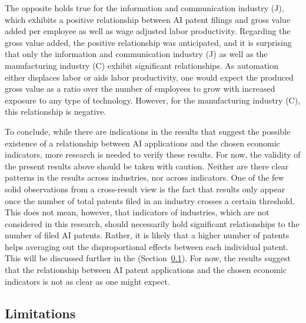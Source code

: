 \documentclass[
  12pt,
  a4paperpaper,
]{article}
\begin{document}
The opposite holds true for the information and communication industry
(J), which exhibits a positive relationship between AI patent filings
and gross value added per employee as well as wage adjusted labor
productivity. Regarding the gross value added, the positive relationship
was anticipated, and it is surprising that only the information and
communication industry (J) as well as the manufacturing industry (C)
exhibit significant relationships. As automation either displaces labor
or aids labor productivity, one would expect the produced gross value as
a ratio over the number of employees to grow with increased exposure to
any type of technology. However, for the manufacturing industry (C),
this relationship is negative.

To conclude, while there are indications in the results that suggest the
possible existence of a relationship between AI applications and the
chosen economic indicators, more research is needed to verify these
results. For now, the validity of the present results above should be
taken with caution. Neither are there clear patterns in the results
across industries, nor across indicators. One of the few solid
observations from a cross-result view is the fact that results only
appear once the number of total patents filed in an industry crosses a
certain threshold. This does not mean, however, that indicators of
industries, which are not considered in this research, should
necessarily hold significant relationships to the number of filed AI
patents. Rather, it is likely that a higher number of patents helps
averaging out the disproportional effects between each individual
patent. This will be discussed further in the 
(Section~\ref{sec-limitations}). For now, the results suggest that the
relationship between AI patent applications and the chosen economic
indicators is not as clear as one might expect.

\subsection{Limitations}\label{sec-limitations}
\end{document}
